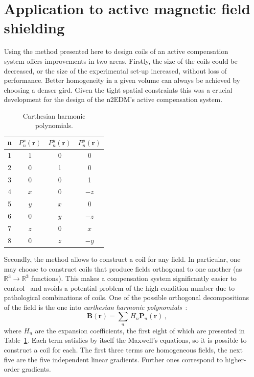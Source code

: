 \section{Application to active magnetic field shielding}
Using the method presented here to design coils of an active compensation system offers improvements in two areas. Firstly, the size of the coils could be decreased, or the size of the experimental set-up increased, without loss of performance. Better homogeneity in a given volume can always be achieved by choosing a denser gird. Given the tight spatial constraints this was a crucial development for the design of the n2EDM's active compensation system.

\begin{table}
  \centering
  \begin{tabular}{c|ccc}
    n & $P_n^x(\mathbf{r})$ & $P_n^y(\mathbf{r})$ & $P_n^y(\mathbf{r})$ \\ \hline
    1 & 1 & 0 & 0 \\
    2 & 0 & 1 & 0 \\
    3 & 0 & 0 & 1 \\ \hline
    4 & $x$ &  0  & $-z$ \\
    5 & $y$ & $x$ &   0  \\
    6 &  0  & $y$ & $-z$ \\
    7 & $z$ &  0  & $ x$ \\
    8 &  0  & $z$ & $-y$ \\
  \end{tabular}
  \caption{Carthesian harmonic polynomials.}
  \label{tab:coils_carthesian_harmonics}
\end{table}

Secondly, the method allows to construct a coil for any field. In particular, one may choose to construct coils that produce fields orthogonal to one another (as $\mathbb{R}^3 \rightarrow \mathbb{R}^3$ functions). This makes a compensation system significantly easier to control~\cite{MRM:MRM1910010107} and avoids a potential problem of the high condition number due to pathological combinations of coils. One of the possible orthogonal decompositions of the field is the one into \emph{carthesian harmonic polynomials}~\cite{Franke2013}:
\begin{equation}
  \mathbf{B}(\mathbf{r}) = \sum_{n}\,H_n\mathbf{P}_n(\mathbf{r}) \ ,
\end{equation}
where $H_n$ are the expansion coefficients, the first eight of which are presented in Table~\ref{tab:coils_carthesian_harmonics}. Each term satisfies by itself the Maxwell's equations, so it is possible to construct a coil for each. The first three terms are homogeneous fields, the next five are the five independent linear gradients. Further ones correspond to higher-order gradients.

